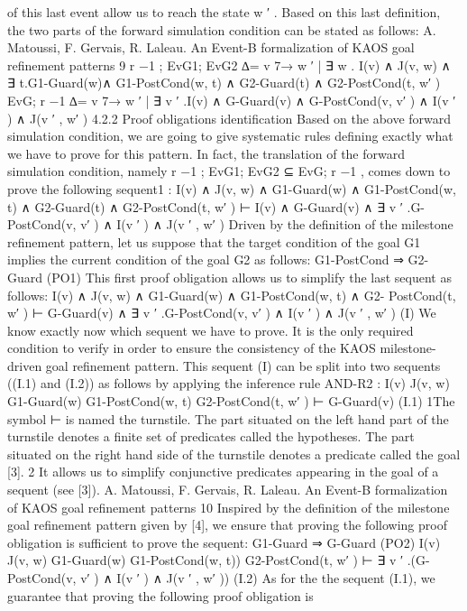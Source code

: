of this last event allow us to reach the state w
′
. Based on this last definition, the two parts
of the forward simulation condition can be stated as follows:
A. Matoussi, F. Gervais, R. Laleau. An Event-B formalization of KAOS goal refinement patterns 9
r
−1
; EvG1; EvG2
∆= {v 7→ w
′
| ∃ w . I(v) ∧ J(v, w) ∧ ∃ t.G1-Guard(w)∧
G1-PostCond(w, t) ∧ G2-Guard(t) ∧ G2-PostCond(t, w′
) }
EvG; r
−1 ∆= {v 7→ w
′
| ∃ v
′
.I(v) ∧ G-Guard(v) ∧ G-PostCond(v, v′
) ∧ I(v
′
) ∧ J(v
′
, w′
) }
4.2.2 Proof obligations identification
Based on the above forward simulation condition, we are going to give systematic rules
defining exactly what we have to prove for this pattern. In fact, the translation of the
forward simulation condition, namely r
−1
; EvG1; EvG2 ⊆ EvG; r
−1
, comes down to prove
the following sequent1
:
I(v) ∧ J(v, w) ∧ G1-Guard(w) ∧ G1-PostCond(w, t) ∧ G2-Guard(t) ∧ G2-PostCond(t, w′
)
⊢
I(v) ∧ G-Guard(v) ∧ ∃ v
′
.G-PostCond(v, v′
) ∧ I(v
′
) ∧ J(v
′
, w′
)
Driven by the definition of the milestone refinement pattern, let us suppose that the target
condition of the goal G1 implies the current condition of the goal G2 as follows:
G1-PostCond ⇒ G2-Guard (PO1)
This first proof obligation allows us to simplify the last sequent as follows:
I(v) ∧ J(v, w) ∧ G1-Guard(w) ∧ G1-PostCond(w, t) ∧ G2-
PostCond(t, w′
)
⊢
G-Guard(v) ∧ ∃ v
′
.G-PostCond(v, v′
) ∧ I(v
′
) ∧ J(v
′
, w′
)
(I)
We know exactly now which sequent we have to prove. It is the only required condition
to verify in order to ensure the consistency of the KAOS milestone-driven goal refinement
pattern. This sequent (I) can be split into two sequents ((I.1) and (I.2)) as follows by applying
the inference rule AND-R2
:
I(v)
J(v, w)
G1-Guard(w)
G1-PostCond(w, t)
G2-PostCond(t, w′
)
⊢
G-Guard(v)
(I.1)
1The symbol ⊢ is named the turnstile. The part situated on the left hand part of the turnstile denotes a
finite set of predicates called the hypotheses. The part situated on the right hand side of the turnstile denotes
a predicate called the goal [3].
2
It allows us to simplify conjunctive predicates appearing in the goal of a sequent (see [3]).
A. Matoussi, F. Gervais, R. Laleau. An Event-B formalization of KAOS goal refinement patterns 10
Inspired by the definition of the milestone goal refinement pattern given by [4], we ensure
that proving the following proof obligation is sufficient to prove the sequent:
G1-Guard ⇒ G-Guard (PO2)
I(v)
J(v, w)
G1-Guard(w)
G1-PostCond(w, t))
G2-PostCond(t, w′
)
⊢
∃ v
′
.(G-PostCond(v, v′
) ∧ I(v
′
) ∧ J(v
′
, w′
))
(I.2)
As for the the sequent (I.1), we guarantee that proving the following proof obligation is
